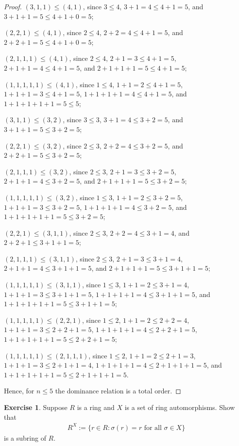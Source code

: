 \documentclass[12pt]{extarticle}
\newcommand{\set}[1]{\{#1\}}
\newcommand{\<}{\langle}
\renewcommand{\>}{\rangle}
\theoremstyle{definition}
\newtheorem{exercise}{Exercise}
\begin{document}
\begin{proof}
  $(3,1,1) \leq (4,1)$, since $ 3 \leq 4$, $3 + 1 = 4 \leq 4 + 1 = 5$, and $3+1+1 = 5 \leq 4+1+0=5$;

  $(2,2,1) \leq (4,1)$, since $ 2 \leq 4$, $2+2=4 \leq 4+1=5$, and $2+2+1 = 5 \leq 4+1+0 = 5$;

  $(2,1,1,1) \leq (4,1)$, since $ 2 \leq 4$, $2+1=3 \leq 4+1=5$, $2+1+1=4 \leq 4+1 = 5$, and $2+1+1+1 = 5 \leq 4+1 = 5$;

  $(1,1,1,1,1) \leq (4,1)$, since $1 \leq 4$, $1+1=2 \leq 4+1=5$, $1+1+1 = 3 \leq 4+1=5$, $1+1+1+1=4 \leq 4+1=5$, and $1+1+1+1+1 = 5 \leq 5$;

  $(3,1,1) \leq (3,2)$, since $ 3 \leq 3$, $3+1=4 \leq 3+2=5$, and $3+1+1 = 5 \leq 3+2 = 5$;

  $(2,2,1) \leq (3,2)$, since $2 \leq 3$, $2+2=4 \leq 3+2=5$, and $2+2+1=5 \leq 3+2=5$;

  $(2,1,1,1) \leq (3,2)$, since $ 2 \leq 3$, $2 + 1 = 3 \leq 3 + 2 = 5$, $2+1+1 = 4 \leq 3+2 = 5$, and $2+1+1+1 = 5 \leq 3+2=5$;

  $(1,1,1,1,1) \leq (3,2)$, since $1 \leq 3$, $1+1=2 \leq 3+2=5$, $1+1+1=3 \leq 3+2=5$, $1+1+1+1=4 \leq 3+2=5$, and $1+1+1+1+1=5 \leq 3+2=5$;

  $(2,2,1) \leq (3,1,1)$, since $ 2 \leq 3$, $2+2=4 \leq 3+1=4$, and $2+2+1 \leq 3+1+1=5$;

  $(2,1,1,1) \leq (3,1,1)$, since $2 \leq 3$, $2+1=3 \leq 3+1=4$, $2+1+1=4 \leq 3+1+1=5$, and $2+1+1+1=5 \leq 3+1+1=5$;

  $(1,1,1,1,1) \leq (3,1,1)$, since $1 \leq 3$, $1+1=2 \leq 3+1=4$, $1+1+1=3 \leq 3+1+1=5$, $1+1+1+1=4 \leq 3+1+1=5$, and $1+1+1+1+1=5 \leq 3+1+1=5$;

  $(1,1,1,1,1) \leq (2,2,1)$, since $1 \leq 2$, $1+1=2 \leq 2+2=4$, $1+1+1 = 3 \leq 2+2+1 = 5$, $1+1+1+1=4 \leq 2+2+1=5$, $1+1+1+1+1 = 5 \leq 2+2+1=5$;

  $(1,1,1,1,1) \leq (2,1,1,1)$, since $1 \leq 2$, $1+1=2 \leq 2+1=3$, $1+1+1=3 \leq 2+1+1=4$, $1+1+1+1=4 \leq 2+1+1+1=5$, and $1+1+1+1+1 = 5 \leq 2+1+1+1=5$.

  Hence, for $n \leq 5$ the dominance relation is a total order. 

\end{proof}
\begin{exercise}
  Suppose $R$ is a ring and $X$ is a set of ring automorphisms. Show that
  \begin{align*}
    R^X := \set{r \in R: \sigma(r)=r \text{ for all } \sigma \in X}
  \end{align*}
  is a subring of $R$. 
\end{exercise}
\end{document}
